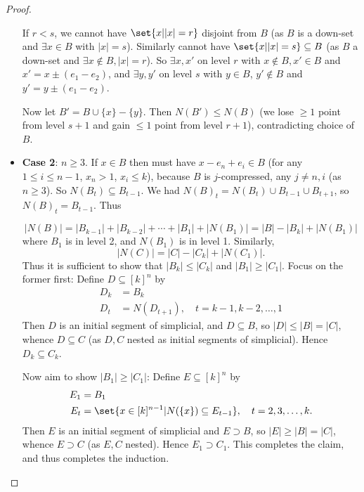 \documentclass{article}
\let\subset\subseteq
\begin{document}
\begin{proof}
\begin{itemize}
      If $r < s$, we cannot have $\set{x | |x| = r}$ disjoint from $B$ (as $B$ is a down-set and $\exists x \in B$ with $|x| = s$).
      Similarly cannot have $\set{x | |x| = s} \subset B$ (as $B$ a down-set and $\exists x \notin B, |x| = r$).
      So $\exists x,x'$ on level $r$ with $x \notin B, x' \in B$ and $x' = x \pm (e_1 - e_2)$, and $\exists y,y'$ on level $s$ with $y \in B$, $y' \notin B$ and $y' = y \pm (e_1 - e_2)$.

      Now let $B' = B \cup \{x\} - \{y\}$. Then $N(B') \leq N(B)$ (we lose $\geq 1$ point from level $s+1$ and gain $\leq 1$ point from level $r+1$), contradicting choice of $B$.
    \item \textbf{Case 2}: $n \geq 3$.
      If $x \in B$ then must have $x-e_n+e_i \in B$ (for any $1 \leq i \leq n-1$, $x_n > 1$, $x_i \leq k$), because $B$ is $j$-compressed, any $j \neq n,i$ (as $n \geq 3$).
      So $N(B_t) \subset B_{t-1}$.
      We had $N(B)_t = N(B_t) \cup B_{t-1} \cup B_{t+1}$, so $N(B)_t = B_{t-1}$.
      Thus

      \begin{equation*}
        |N(B)| = |B_{k-1}| + |B_{k-2}| + \dotsb + |B_1| + |N(B_1)| = |B| - |B_k| + |N(B_1)|
      \end{equation*}
      where $B_1$ is in level 2, and $N(B_1)$ is in level 1.
      Similarly,
      \begin{equation*}
        |N(C)| = |C| - |C_k| + |N(C_1)|.
      \end{equation*}
      Thus it is sufficient to show that $|B_k| \leq |C_k|$ and $|B_1| \geq |C_1|$.
      Focus on the former first:
      Define  $D \subset [k]^n$ by
      \begin{align*}
        D_k &= B_k \\
        D_t &= N(D_{t+1}), \quad t = k-1, k-2, \dotsc, 1
      \end{align*}
      Then $D$ is an initial segment of simplicial, and $D \subset B$, so $|D| \leq |B| = |C|$, whence $D \subset C$ (as $D,C$ nested as initial segments of simplicial).
      Hence $D_k \subset C_k$.

      Now aim to show $|B_1| \geq |C_1|$:
      Define $E \subset [k]^n$ by
      \begin{align*}
        E_1 &= B_1 \\
        E_t &= \set{x \in [k]^{n-1} | N(\{x\}) \subset E_{t-1}}, \quad t=2,3,\dotsc,k.
      \end{align*}
      Then $E$ is an initial segment of simplicial and $E \supset B$, so $|E| \geq |B| = |C|$, whence $E \supset C$ (as $E,C$ nested). Hence $E_1 \supset C_1$.
      This completes the claim, and thus completes the induction. \qedhere
  \end{itemize}
\end{proof}
\end{document}

